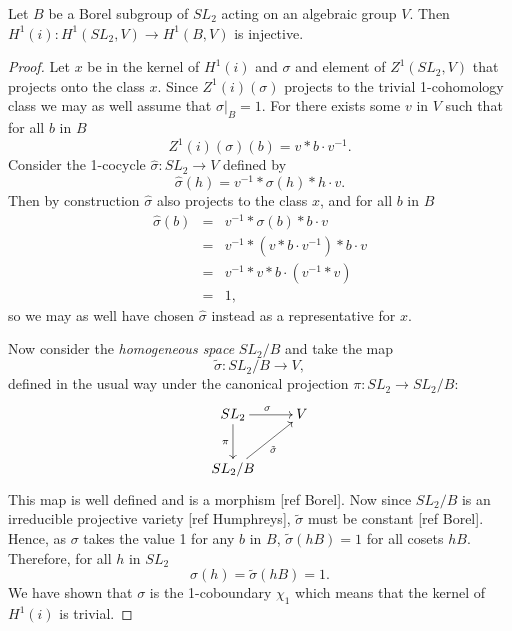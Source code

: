 \begin{lemma} Let $B$ be a Borel subgroup of $SL_2$ acting on an algebraic group $V$. Then $H^1(i):H^1(SL_2, V)\rightarrow H^1(B, V)$ is injective.
\end{lemma}
\begin{proof}
Let $x$ be in the kernel of $H^1(i)$ and $\sigma$ and element of $Z^1(SL_2, V)$ that projects onto the class $x$. Since $Z^1(i)(\sigma)$ projects to the trivial 1-cohomology class we may as well assume that $\sigma|_B = 1$. For there exists some $v$ in $V$ such that for all $b$ in $B$
\begin{displaymath}
	Z^1(i)(\sigma)(b) = v*b\cdot v^{-1}.
\end{displaymath}
Consider the 1-cocycle $\hat{\sigma}:SL_2\rightarrow V$ defined by
\begin{displaymath}
	\hat{\sigma}(h) = v^{-1}*\sigma(h)*h\cdot v.
\end{displaymath}
Then by construction $\hat{\sigma}$ also projects to the class $x$, and for all $b$ in $B$
\begin{eqnarray*}
	\hat{\sigma}(b) &=& v^{-1}*\sigma(b)*b\cdot v\\
	&=& v^{-1}*(v*b\cdot v^{-1})*b\cdot v\\
	&=& v^{-1}*v*b\cdot (v^{-1} * v)\\
	&=& 1,
\end{eqnarray*}
so we may as well have chosen $\hat{\sigma}$ instead as a representative for $x$. 

Now consider the \emph{homogeneous space} $SL_2/B$ \cite{humphreys1975linear} and take the map 
\begin{displaymath}
	\tilde{\sigma}:SL_2/B \rightarrow V,
\end{displaymath}
defined in the usual way under the canonical projection $\pi:SL_2 \rightarrow SL_2/B$:
\begin{displaymath}
	\xymatrix{
	SL_2 \ar[r]^{\sigma} \ar[d]_{\pi} & V\\
	SL_2/B \ar[ru]_{\tilde{\sigma}}
	}
\end{displaymath}
This map is well defined and is a morphism [ref Borel]. Now since $SL_2/B$ is an irreducible projective variety [ref Humphreys], $\tilde{\sigma}$ must be constant [ref Borel]. Hence, as $\sigma$ takes the value 1 for any $b$ in $B$, $\tilde{\sigma}(hB) = 1$ for all cosets $hB$. Therefore, for all $h$ in $SL_2$
\begin{displaymath}
	\sigma(h) = \tilde{\sigma}(hB) = 1.
\end{displaymath}
We have shown that $\sigma$ is the 1-coboundary $\chi_1$ which means that the kernel of $H^1(i)$ is trivial.
\end{proof} 


